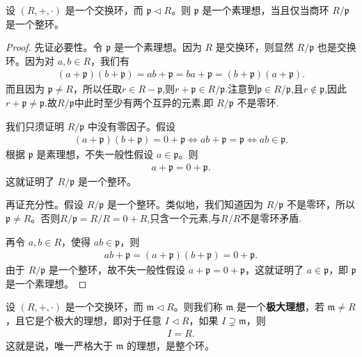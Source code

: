 \documentclass[../../main.tex]{subfiles}
\begin{document}
\begin{proposition}[素理想的充要条件]\label{proposition:素理想的充要条件}
设 $(R, +, \cdot)$ 是一个交换环，而 $\mathfrak{p} \lhd R$。则 $\mathfrak{p}$ 是一个素理想，当且仅当商环 $R / \mathfrak{p}$ 是一个整环。
\end{proposition}
\begin{proof}
先证必要性。令 $\mathfrak{p}$ 是一个素理想。因为 $R$ 是交换环，则显然 $R / \mathfrak{p}$ 也是交换环。因为对 $a, b \in R$，我们有
\begin{align*}
(a + \mathfrak{p})(b + \mathfrak{p}) = ab + \mathfrak{p} = ba + \mathfrak{p} = (b + \mathfrak{p})(a + \mathfrak{p}).
\end{align*}
而且因为 $\mathfrak{p} \neq R$，所以任取$r\in R-\mathfrak{p}$,则$r+\mathfrak{p}\in R/\mathfrak{p}$.注意到$\mathfrak{p}\in R/\mathfrak{p}$,且$r\notin \mathfrak{p}$,因此$r+\mathfrak{p}\ne \mathfrak{p}$.故$R/\mathfrak{p}$中此时至少有两个互异的元素,即 $R / \mathfrak{p}$ 不是零环.

我们只须证明 $R / \mathfrak{p}$ 中没有零因子。假设
\begin{align*}
(a+\mathfrak{p} )(b+\mathfrak{p} )=0+\mathfrak{p} \Leftrightarrow ab+\mathfrak{p} =\mathfrak{p} \Leftrightarrow ab\in \mathfrak{p} .
\end{align*}
根据 $\mathfrak{p}$ 是素理想，不失一般性假设 $a \in \mathfrak{p}$。则
\begin{align*}
a + \mathfrak{p} = 0 + \mathfrak{p} .
\end{align*}
这就证明了 $R / \mathfrak{p}$ 是一个整环。

再证充分性。假设 $R / \mathfrak{p}$ 是一个整环。类似地，我们知道因为 $R / \mathfrak{p}$ 不是零环，所以 $\mathfrak{p} \neq R$。否则$R/\mathfrak{p}=R/R={0+R}$,只含一个元素,与$R/R$不是零环矛盾.

再令 $a, b \in R$，使得 $ab \in \mathfrak{p}$，则
\begin{align*}
ab + \mathfrak{p} = (a + \mathfrak{p})(b + \mathfrak{p}) = 0 + \mathfrak{p}.
\end{align*}
由于 $R / \mathfrak{p}$ 是一个整环，故不失一般性假设 $a + \mathfrak{p} = 0 + \mathfrak{p}$，这就证明了 $a \in \mathfrak{p}$，即 $\mathfrak{p}$ 是一个素理想。 

\end{proof}

\begin{definition}[极大理想]
设 $(R, +, \cdot)$ 是一个交换环，而 $\mathfrak{m} \lhd R$。则我们称 $\mathfrak{m}$ 是一个\textbf{极大理想}，若 $\mathfrak{m} \neq R$，且它是个极大的理想，即对于任意 $I \lhd R$，如果 $I \supsetneq \mathfrak{m}$，则
\begin{align*}
I = R .
\end{align*}
这就是说，唯一严格大于 $\mathfrak{m}$ 的理想，是整个环。
\end{definition}
\end{document}
